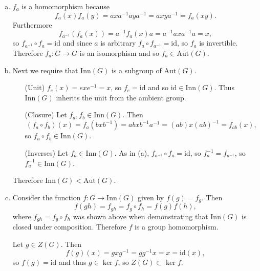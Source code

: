 \documentclass{article}
\begin{document}
\begin{Answer}
\begin{enumerate}[(a)]
  \item{$f_a$ is a homomorphism because
        $$
        f_a(x) f_a(y) = a x a^{-1} a y a^{-1} 
                      = a x y a^{-1}
                      = f_a(xy).
        $$
        Furthermore
        $$
        f_{a^{-1}}(f_a(x)) = a^{-1} f_a(x) a
                         = a^{-1} a x a^{-1} a
                         = x,
        $$
        so $f_{a^{-1}} \circ f_a = \mathrm{id}$ and since $a$ is
        arbitrary $f_a \circ f_{a^{-1}} = \mathrm{id}$, so $f_a$ is
        invertible. Therefore $f_a : G \to G$ is an isomorphism and
        so $f_a \in \mathrm{Aut}(G)$.
        }
      \item{Next we require that $\mathrm{Inn}(G)$ is a subgroup
            of $\mathrm{Aut}(G)$.
        \begin{itemize}
          \item[(Unit)]{
            $f_e(x) = e x e^{-1} = x$, so
            $f_e = \mathrm{id}$ and so $\mathrm{id} \in
            \mathrm{Inn}(G)$. Thus $\mathrm{Inn}(G)$ inherits the unit
            from the ambient group.
            }
          \item[(Closure)]{
              Let $f_a, f_b \in \mathrm{Inn}(G)$. Then
              $$
              (f_a \circ f_b)(x) = f_a( b x b^{-1})
                                 = a b x b^{-1} a^{-1}
                                 = (ab) x (ab)^{-1}
                                 = f_{ab}(x),
              $$
              so $f_a \circ f_b \in \mathrm{Inn}(G)$.
            }
          \item[(Inverses)]{
              Let $f_a \in \mathrm{Inn}(G)$.
              As in (a), $f_{a^{-1}} \circ f_a = \mathrm{id}$, so
              $f_a^{-1} = f_{a^{-1}}$, so $f_a^{-1} \in \mathrm{Inn}(G)$.
            }
        \end{itemize}
        Therefore $\mathrm{Inn}(G) < \mathrm{Aut}(G)$.
      }
      \item{Consider the function 
            $f: G \to \mathrm{Inn}(G)$ given by $f(g) = f_g$. Then
            $$
            f(gh) = f_{gh} = f_g \circ f_h = f(g)f(h),
            $$
            where $f_{gh} = f_g \circ f_h$ was shown above when
            demonstrating that $\mathrm{Inn}(G)$ is closed under composition.
            Therefore $f$ is a group homomorphism.

            Let $g \in Z(G)$. Then 
            $$
            f(g)(x) = g x g^{-1} = g g^{-1} x = x = \mathrm{id}(x),
            $$
            so $f(g) = \mathrm{id}$ and thus $g \in \ker f$, so $Z(G)
            \subset \ker f$.

}
\end{enumerate}
\end{Answer}
\end{document}
